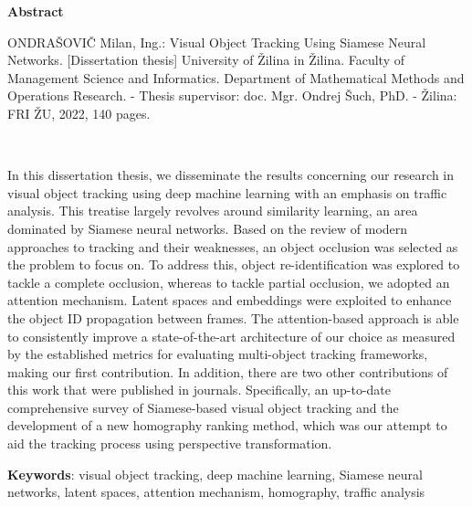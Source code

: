\thispagestyle{empty}

\begin{center}
    \Large{\textbf{Abstract}}
\end{center}

\noindent ONDRAŠOVIČ Milan, Ing.: Visual Object Tracking Using Siamese Neural Networks.
    [Dissertation thesis] University of Žilina in Žilina. Faculty of Management Science and Informatics. Department of Mathematical Methods and Operations Research. - Thesis supervisor: doc. Mgr. Ondrej Šuch, PhD. - Žilina: FRI ŽU, 2022, 140 pages.

\

\noindent In this dissertation thesis, we disseminate the results concerning our research in visual object tracking using deep machine learning with an emphasis on traffic analysis. This treatise largely revolves around similarity learning, an area dominated by Siamese neural networks. Based on the review of modern approaches to tracking and their weaknesses, an object occlusion was selected as the problem to focus on. To address this, object re-identification was explored to tackle a complete occlusion, whereas to tackle partial occlusion, we adopted an attention mechanism. Latent spaces and embeddings were exploited to enhance the object ID propagation between frames. The attention-based approach is able to consistently improve a state-of-the-art architecture of our choice as measured by the established metrics for evaluating multi-object tracking frameworks, making our first contribution. In addition, there are two other contributions of this work that were published in journals. Specifically, an up-to-date comprehensive survey of Siamese-based visual object tracking and the development of a new homography ranking method, which was our attempt to aid the tracking process using perspective transformation.

\noindent \textbf{Keywords}: visual object tracking, deep machine learning, Siamese neural networks, latent spaces, attention mechanism, homography, traffic analysis
